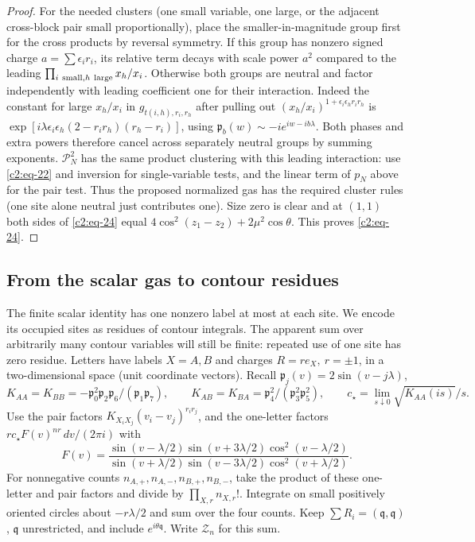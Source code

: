 \begin{proof}
For the needed clusters (one small variable, one large, or the adjacent cross-block pair small proportionally), place the smaller-in-magnitude group first for the cross products by reversal symmetry. If this group has nonzero signed charge \(a=\sum\epsilon_i r_i\), its relative term decays with scale power \(a^2\) compared to the leading \(\prod_{i\ {\rm small},h\ {\rm large}}x_h/x_i\). Otherwise both groups are neutral and factor independently with leading coefficient one for their interaction. Indeed the constant for large \(x_h/x_i\) in \(g_{t(i,h),r_i,r_h}\) after pulling out \((x_h/x_i)^{1+\epsilon_i\epsilon_h r_i r_h}\) is
\(\exp[i\lambda\epsilon_i\epsilon_h(2-r_i r_h)(r_h-r_i)]\), using \(\mathfrak p_b(w)\sim-i e^{iw-ib\lambda}\). Both phases and extra powers therefore cancel across separately neutral groups by summing exponents. \(\mathcal P_N^2\) has the same product clustering with this leading interaction: use \eqref{c2:eq-22} and inversion for single-variable tests, and the linear term of \(p_N\) above for the pair test. Thus the proposed normalized gas has the required cluster rules (one site alone neutral just contributes one). Size zero is clear and at \((1,1)\) both sides of \eqref{c2:eq-24} equal \(4\cos^2(z_1-z_2)+2\mu^2\cos\theta\). This proves \eqref{c2:eq-24}.
\end{proof}

\subsection{From the scalar gas to contour residues}
\label{c2:sec-contour-representation}

The finite scalar identity has one nonzero label at most at each site.
We encode its occupied sites as residues of contour integrals. The apparent
sum over arbitrarily many contour variables will still be finite: repeated
use of one site has zero residue.
Letters have labels \(X=A,B\) and charges \(R=r e_X,\ r=\pm1\), in a two-dimensional space (unit coordinate vectors). Recall \(\mathfrak p_j(v)=2\sin(v-j\lambda)\),
\[
 K_{AA}=K_{BB}=-\mathfrak p_0^2\mathfrak p_2\mathfrak p_6/(\mathfrak p_1\mathfrak p_7),\qquad K_{AB}=K_{BA}=\mathfrak p_4^2/(\mathfrak p_3^2\mathfrak p_5^2),
 \qquad c_\star=\lim_{s\downarrow0}\sqrt{K_{AA}(is)}/s.
\]
Use the pair factors \(K_{X_iX_j}(v_i-v_j)^{r_i r_j}\), and the one-letter factors \(r c_\star F(v)^{nr}\,dv/(2\pi i)\) with
\[
 F(v)=\frac{\sin(v-\lambda/2)\sin(v+3\lambda/2)\cos^2(v-\lambda/2)}
 {\sin(v+\lambda/2)\sin(v-3\lambda/2)\cos^2(v+\lambda/2)}.
\]
For nonnegative counts \(n_{A,+},n_{A,-},n_{B,+},n_{B,-}\), take the
product of these one-letter and pair factors and divide by
\(\prod_{X,r}n_{X,r}!\). Integrate on small positively oriented circles about \(-r\lambda/2\) and sum over the four counts. Keep \(\sum R_i=(\mathfrak q,\mathfrak q)\), \(\mathfrak q\) unrestricted, and include \(e^{i\theta \mathfrak q}\). Write \(\mathcal Z_n\) for this sum.

